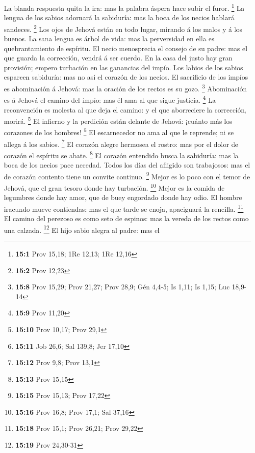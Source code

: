  La blanda respuesta quita la ira: mas la palabra áspera
hace subir el furor. \footnote{\textbf{15:1} Prov 15,18; 1Re 12,13; 1Re
  12,16}  La lengua de los sabios adornará la sabiduría:
mas la boca de los necios hablará sandeces. \footnote{\textbf{15:2} Prov
  12,23}  Los ojos de Jehová están en todo lugar, mirando
á los malos y á los buenos.  La sana lengua es árbol de
vida: mas la perversidad en ella es quebrantamiento de espíritu.
 El necio menosprecia el consejo de su padre: mas el que
guarda la corrección, vendrá á ser cuerdo.  En la casa del
justo hay gran provisión; empero turbación en las ganancias del impío.
 Los labios de los sabios esparcen sabiduría: mas no así
el corazón de los necios.  El sacrificio de los impíos es
abominación á Jehová: mas la oración de los rectos es su gozo.
\footnote{\textbf{15:8} Prov 15,29; Prov 21,27; Prov 28,9; Gén 4,4-5; Is
  1,11; Is 1,15; Luc 18,9-14}  Abominación es á Jehová el
camino del impío: mas él ama al que sigue justicia. \footnote{\textbf{15:9}
  Prov 11,20}  La reconvención es molesta al que deja el
camino: y el que aborreciere la corrección, morirá. \footnote{\textbf{15:10}
  Prov 10,17; Prov 29,1}  El infierno y la perdición
están delante de Jehová: ¡cuánto más los corazones de los hombres!
\footnote{\textbf{15:11} Job 26,6; Sal 139,8; Jer 17,10} 
El escarnecedor no ama al que le reprende; ni se allega á los sabios.
\footnote{\textbf{15:12} Prov 9,8; Prov 13,1}  El corazón
alegre hermosea el rostro: mas por el dolor de corazón el espíritu se
abate. \footnote{\textbf{15:13} Prov 15,15}  El corazón
entendido busca la sabiduría: mas la boca de los necios pace necedad.
 Todos los días del afligido son trabajosos: mas el de
corazón contento tiene un convite continuo. \footnote{\textbf{15:15}
  Prov 15,13; Prov 17,22}  Mejor es lo poco con el temor
de Jehová, que el gran tesoro donde hay turbación. \footnote{\textbf{15:16}
  Prov 16,8; Prov 17,1; Sal 37,16}  Mejor es la comida de
legumbres donde hay amor, que de buey engordado donde hay odio.
 El hombre iracundo mueve contiendas: mas el que tarde se
enoja, apaciguará la rencilla. \footnote{\textbf{15:18} Prov 15,1; Prov
  26,21; Prov 29,22}  El camino del perezoso es como seto
de espinos: mas la vereda de los rectos como una calzada. \footnote{\textbf{15:19}
  Prov 24,30-31}  El hijo sabio alegra al padre: mas el
